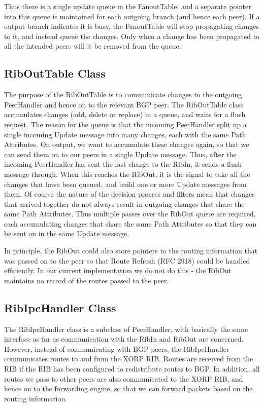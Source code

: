 \documentclass[11pt]{article}
\begin{document}
Thus there is a single update queue in the FanoutTable, and a separate
pointer into this queue is maintained for each outgoing branch (and
hence each peer).  If a output branch indicates it is busy, the
FanoutTable will stop propagating changes to it, and instead queue the
changes.  Only when a change has been propagated to all the intended
peers will it be removed from the queue.  

\subsection{RibOutTable Class}

The purpose of the RibOutTable is to communicate changes to the
outgoing PeerHandler and hence on to the relevant BGP peer.  The
RibOutTable class accumulates changes (add, delete or replace) in a
queue, and waits for a flush request.  The reason for the queue is
that the incoming PeerHandler split up a single incoming Update message
into many changes, each with the same Path Attributes.  On output, we
want to accumulate these changes again, so that we can send them on to
our peers in a single Update message.  Thus, after the incoming
PeerHandler has sent the last change to the RibIn, it sends a flush
message through.  When this reaches the RibOut, it is the signal to
take all the changes that have been queued, and build one or more
Update messages from them.  Of course the nature of the decision
process and filters mean that changes that arrived together do not
always result in outgoing changes that share the same Path
Attributes.  Thus multiple passes over the RibOut queue are required,
each accumulating changes that share the same Path Attributes so that
they can be sent on in the same Update message.

In principle, the RibOut could also store pointers to the routing
information that was passed on to the peer so that Route Refresh
(RFC 2918) could be handled efficiently.  In our current implementation
we do not do this - the RibOut maintains no record of the routes
passed to the peer.

\subsection{RibIpcHandler Class}

The RibIpcHandler class is a subclass of PeerHandler, with basically
the same interface as far as communication with the RibIn and RibOut
are concerned. However, instead of communicating with BGP peers, the
RibIpcHandler communicates routes to and from the XORP RIB.  Routes
are received from the RIB if the RIB has been configured to
redistribute routes to BGP.  In addition, all routes we pass to other
peers are also communicated to the XORP RIB, and hence on to the
forwarding engine, so that we can forward packets based on the routing
information.
\end{document}

